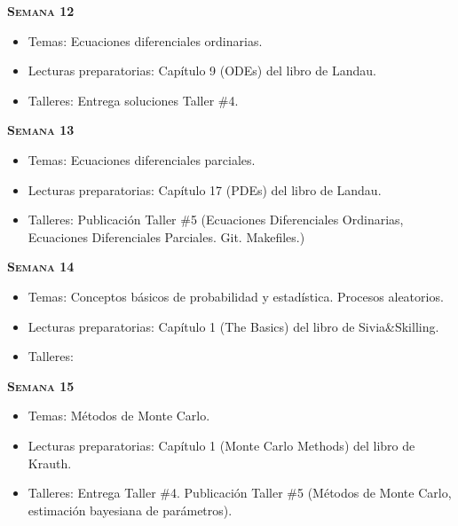 \documentclass[letterpaper,10pt,onecolumn]{article}
\begin{document}
\noindent\textbf{\textsc{Semana 12}}\\[-0.5cm]
\begin{itemize}
\item Temas: Ecuaciones diferenciales ordinarias. \\[-0.6cm]
\item Lecturas preparatorias: Cap\'itulo 9 (ODEs) del libro de
  Landau. \\[-0.6cm] 
\item Talleres: 
Entrega soluciones Taller \#4. 
\\[-0.6cm]
\end{itemize}

\noindent\textbf{\textsc{Semana 13}}\\[-0.5cm]
\begin{itemize}
\item Temas: Ecuaciones diferenciales parciales. \\[-0.6cm]
\item Lecturas preparatorias: Cap\'itulo 17 (PDEs) del libro de
  Landau. \\[-0.6cm] 
\item Talleres: 
Publicaci\'on Taller \#5
(Ecuaciones Diferenciales Ordinarias, Ecuaciones Diferenciales
Parciales. Git. Makefiles.)
\\[-0.6cm]
\end{itemize}

\noindent\textbf{\textsc{Semana 14}}\\[-0.5cm]
\begin{itemize}
\item Temas: Conceptos b\'asicos de
  probabilidad y estad\'istica. Procesos aleatorios. \\[-0.6cm]  
\item Lecturas preparatorias: Cap\'itulo 1 (The Basics) del libro de
  Sivia\&Skilling. \\[-0.6cm]
\item Talleres: 
\\[-0.6cm]
\end{itemize}

\noindent\textbf{\textsc{Semana 15}}\\[-0.5cm]
\begin{itemize}
\item Temas: M\'etodos de Monte Carlo. \\[-0.6cm]
\item Lecturas preparatorias: Cap\'itulo 1 (Monte Carlo Methods) del
  libro de Krauth.\\[-0.6cm]
\item Talleres: Entrega Taller \#4. Publicaci\'on Taller \#5
  (M\'etodos de Monte Carlo, estimaci\'on bayesiana de par\'ametros). \\[-0.6cm]
\end{itemize}
\end{document}

